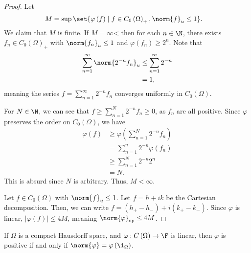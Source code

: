 \documentclass[10pt]{mypackage}
\begin{document}
\begin{proof}
  Let
  \begin{align*}
    M &= \sup\set{\varphi\left(f\right)\mid f\in C_0\left(\Omega\right)_{+},\norm{f}_{u}\leq 1}.
  \end{align*}
  We claim that $M$ is finite. If $M = \infty$< then for each $n\in \N$, there exists $f_n\in C_0\left(\Omega\right)_{+}$ with $\norm{f_n}_{u}\leq 1$ and $\varphi\left(f_n\right) \geq 2^n$. Note that
  \begin{align*}
    \sum_{n=1}^{\infty}\norm{2^{-n}f_n}_{u} &\leq \sum_{n=1}^{\infty}2^{-n}\\
                                            &= 1,
  \end{align*}
  meaning the series $f = \sum_{n=1}^{\infty}2^{-n}f_n$ converges uniformly in $C_0\left(\Omega\right)$.\newline

  For $N\in \N$, we can see that $f\geq \sum_{n=1}^{N}2^{-n}f_n \geq 0$, as $f_n$ are all positive. Since $\varphi$ preserves the order on $C_0\left(\Omega\right)$, we have
  \begin{align*}
    \varphi(f) &\geq \varphi\left(\sum_{n=1}^{N}2^{-n}f_n\right)\\
               &= \sum_{n=1}^{n}2^{-n}\varphi\left(f_n\right)\\
               &\geq \sum_{n=1}^{N}2^{-n}2^{n}\\
               &= N.
  \end{align*}
  This is absurd since $N$ is arbitrary. Thus, $M < \infty$.\newline

  Let $f\in C_0\left(\Omega\right)$ with $\norm{f}_u \leq 1$. Let $f = h + ik$ be the Cartesian decomposition. Then, we can write $f = \left(h_{+} - h_{-}\right) + i\left(k_{+} - k_{-}\right)$. Since $\varphi$ is linear, $\left\vert \varphi(f) \right\vert \leq 4M$, meaning $\norm{\varphi}_{\text{op}} \leq 4M$.
\end{proof}
\begin{proposition}
  If $\Omega$ is a compact Hausdorff space, and $\varphi: C\left(\Omega\right)\rightarrow \F$ is linear, then $\varphi$ is positive if and only if $\norm{\varphi} = \varphi\left(\1_{\Omega}\right)$.
\end{proposition}
\end{document}
